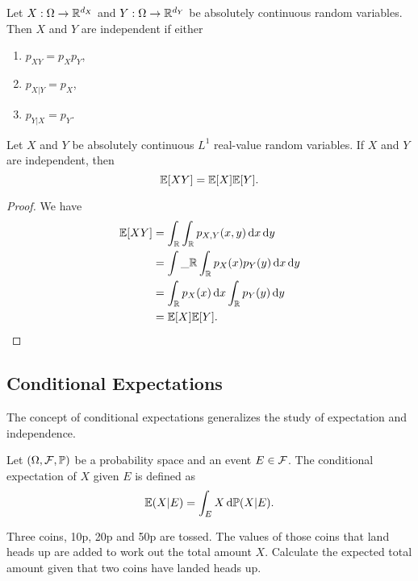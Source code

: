 \begin{proposition}
  Let $X:\Omega\to\mathbb{R}^{d_X}$ and $Y:\Omega\to\mathbb{R}^{d_Y}$ be absolutely continuous random variables. Then $X$ and $Y$ are independent if either
  \begin{enumerate}[label=(\arabic*)]
    \item $p_{XY}=p_Xp_Y$,
    \item $p_{X|Y}=p_X$,
    \item $p_{Y|X}=p_Y$.
  \end{enumerate}
\end{proposition}

\begin{proposition}
  \label{theorem:independent-expectation}
  Let $X$ and $Y$ be absolutely continuous $L^1$ real-value random variables. If $X$ and $Y$ are independent, then
  \begin{equation}
    \mathbb{E}[XY]=\mathbb{E}[X]\mathbb{E}[Y].
  \end{equation}
\end{proposition}

\begin{proof}
  We have
  \begin{align*}
    \mathbb{E}[XY]
     & = \int_{\mathbb{R}}\int_{\mathbb{R}}p_{X,Y}(x,y)\,\mathrm{d} x\,\mathrm{d} y  \\
     & = \int\_{\mathbb{R}}\int_{\mathbb{R}}p_X(x)p_Y(y)\,\mathrm{d} x\,\mathrm{d} y \\
     & =\int_{\mathbb{R}}p_X(x)\,\mathrm{d} x\int_{\mathbb{R}}p_Y(y)\,\mathrm{d} y   \\
     & =\mathbb{E}[X]\mathbb{E}[Y].
  \end{align*}
\end{proof}

\subsection{Conditional Expectations}
The concept of conditional expectations generalizes the study of expectation and independence.

\begin{definition}
  Let $(\Omega, \mathcal{F},\mathbb{P})$ be a probability space and an event $E\in\mathcal{F}$. The conditional expectation of $X$ given $E$ is defined as
  \begin{equation}
    \mathbb{E}(X|E)=\int_{E}X\,\mathrm{d} \mathbb{P}(X|E).
  \end{equation}
\end{definition}

\begin{example}
  Three coins, 10p, 20p and 50p are tossed. The values of those coins that land heads up are added to work out the total amount $X$. Calculate the expected total amount given that two coins have landed heads up.
\end{example}

